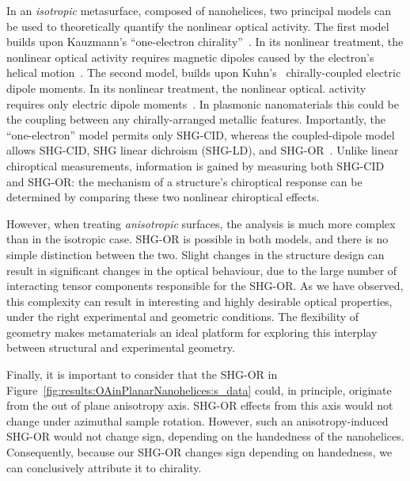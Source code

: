 In an \textit{isotropic} metasurface, composed of nanohelices, two principal models can be used to theoretically quantify the nonlinear optical activity. The first model builds upon Kauzmann's ``one-electron chirality''~\cite{Kauzmann1957a}.
In its nonlinear treatment, the nonlinear optical activity requires magnetic dipoles caused by the electron's helical motion~\cite{Maki1996, Hache2001a}.
The second model, builds upon Kuhn's~\cite{Kuhn1930} chirally-coupled electric dipole moments. In its nonlinear treatment, the nonlinear optical. activity requires only electric dipole moments~\cite{Hache2001a}.
In plasmonic nanomaterials this could be the coupling between any chirally-arranged metallic features. Importantly, the ``one-electron'' model permits only SHG-CID, whereas the coupled-dipole model allows SHG-CID, SHG linear dichroism (SHG-LD), and SHG-OR~\cite{Fischer2005a}.
Unlike linear chiroptical measurements, information is gained by measuring both SHG-CID and SHG-OR: the mechanism of a structure's chiroptical response can be determined by comparing these two nonlinear chiroptical effects. 

However, when treating \textit{anisotropic} surfaces, the analysis is much more complex than in the isotropic case. SHG-OR is possible in both models, and there is no simple distinction between the two. Slight changes in the structure design can result in significant changes in the optical behaviour, due to the large number of interacting tensor components responsible for the SHG-OR. As we have observed, this complexity can result in interesting and highly desirable optical properties, under the right experimental and geometric conditions. The flexibility of geometry makes metamaterials an ideal platform for exploring this interplay between structural and experimental geometry. 

Finally, it is important to consider that the SHG-OR in Figure~\ref{fig:results:OAinPlanarNanohelices:s_data} could, in principle, originate from the out of plane anisotropy axis. SHG-OR effects from this axis would not change under azimuthal sample rotation. However, such an anisotropy-induced SHG-OR would not change sign, depending on the handedness of the nanohelices. Consequently, because our SHG-OR changes sign depending on handedness, we can conclusively attribute it to chirality. 

